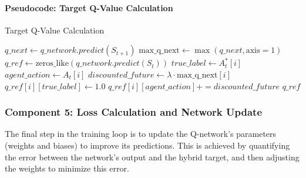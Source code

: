 \documentclass{report}
\begin{document}
\paragraph{Pseudocode: Target Q-Value Calculation}
\begin{algorithm}[H]
\caption{Target Q-Value Calculation}
\begin{algorithmic}[1]
    \State $q\_next \gets q\_network.predict(S_{t+1})$
    \State $\text{max\_q\_next} \gets \max(q\_next, \text{axis}=1)$
    \State $q\_ref \gets \text{zeros\_like}(q\_network.predict(S_t))$
        \State $true\_label \gets A^*_t[i]$
        \State $agent\_action \gets A_t[i]$
        \State $discounted\_future \gets \lambda \cdot \text{max\_q\_next}[i]$
        \State $q\_ref[i][true\_label] \gets 1.0$
        \State $q\_ref[i][agent\_action] += discounted\_future$
    \EndFor
    \State \Return $q\_ref$
\EndFunction
\end{algorithmic}
\end{algorithm}

\subsubsection{Component 5: Loss Calculation and Network Update}

The final step in the training loop is to update the Q-network's parameters (weights and biases) to improve its predictions. This is achieved by quantifying the error between the network's output and the hybrid target, and then adjusting the weights to minimize this error.
\end{document}
